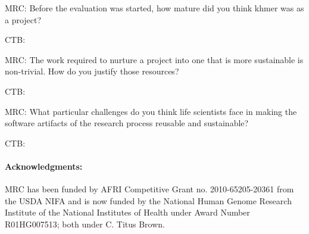 \documentclass{article}
\begin{document}

MRC: Before the evaluation was started, how mature did you think khmer was as a
project?

CTB: 

MRC: The work required to nurture a project into one that is more sustainable is
non-trivial. How do you justify those resources?

CTB:

MRC: What particular challenges do you think life scientists face in making the
software artifacts of the research process reusable and sustainable?

CTB:





\paragraph{Acknowledgments:}
MRC has been funded by AFRI Competitive Grant no. 2010-65205-20361 from the USDA NIFA
and is now funded by the National Human Genome Research Institute of the National Institutes of
Health under Award Number R01HG007513; both under C. Titus Brown.

%








\end{document}
